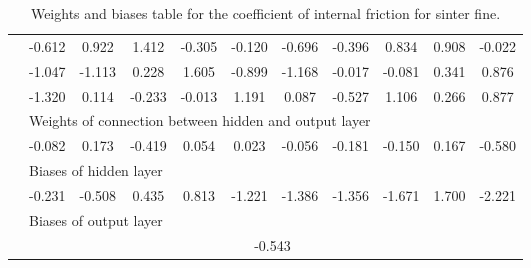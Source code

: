 \begin{table}[htbp]
\begin{tabular}{l|cccccccccc}
  & -0.612 &  0.922 &  1.412 &  -0.305 &  -0.120 &  -0.696 &  -0.396 &  0.834 &  0.908 &  -0.022 \\ 
  & -1.047 &  -1.113 &  0.228 &  1.605 &  -0.899 &  -1.168 &  -0.017 &  -0.081 &  0.341 &  0.876 \\ 
  & -1.320 &  0.114 &  -0.233 &  -0.013 &  1.191 &  0.087 &  -0.527 &  1.106 &  0.266 &  0.877 \\ 
\hline 
   &    \multicolumn{10}{l}{Weights of connection between hidden and output layer}  \\ 
  & -0.082 &  0.173 &  -0.419 &  0.054 &  0.023 &  -0.056 &  -0.181 &  -0.150 &  0.167 &  -0.580 \\ 
\hline 
   &    \multicolumn{10}{l}{Biases of hidden layer}  \\ 
  & -0.231 &  -0.508 &  0.435 &  0.813 &  -1.221 &  -1.386 &  -1.356 &  -1.671 &  1.700 &  -2.221 \\ 
\hline 
\hline 
   &    \multicolumn{10}{l}{Biases of output layer}  \\ 
 &    \multicolumn{10}{c}{-0.543}  \\ 
\hline 
 \end{tabular} 
\caption[Weights and biases table for the coefficient of internal friction
for sinter fine]{Weights and biases table for the coefficient of internal
friction for sinter fine.}
\label{tab:originalsinterfinesct} 
\end{table}